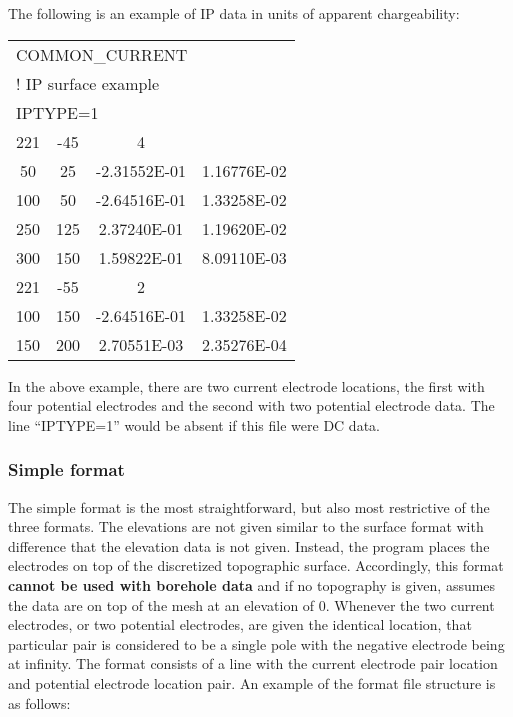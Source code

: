 The following is an example of IP data in units of apparent chargeability:

\begin{fileExample}
\begin{tabular}{|cccc|}
\hline
\multicolumn{4}{|l|}{COMMON\_CURRENT} \\
\multicolumn{4}{|l|}{! IP surface example} \\
\multicolumn{4}{|l|}{IPTYPE=1} \\
221 & -45  &  4 & \\
50 &   25  & -2.31552E-01 &  1.16776E-02 \\
100 &   50 &  -2.64516E-01 &  1.33258E-02 \\
250 &  125 &  2.37240E-01 &  1.19620E-02 \\
300 &  150  &  1.59822E-01 &  8.09110E-03 \\
221 &  -55 &  2 & \\
100 &  150 & -2.64516E-01 & 1.33258E-02 \\
150 &  200 &  2.70551E-03 & 2.35276E-04 \\
\hline
\end{tabular}
\end{fileExample}
%
In the above example, there are two current electrode locations, the first with four potential electrodes and the second with two potential electrode data. The line ``IPTYPE=1'' would be absent if this file were DC data. 

\subsubsection*{Simple format}
The simple format is the most straightforward, but also most restrictive of the three formats. The elevations are not given similar to the surface format with difference that the elevation data is not given. Instead, the program places the electrodes on top of the discretized topographic surface. Accordingly, this format \textbf{cannot be used with borehole data} and if no topography is given, assumes the data are on top of the mesh at an elevation of 0. Whenever the two current electrodes, or two potential electrodes, are given the identical location, that particular pair is considered to be a single pole with the negative electrode being at infinity. The format consists of a line with the current electrode pair location and potential electrode location pair. An example of the  format file structure is as follows:

